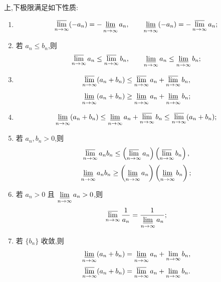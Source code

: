\begin{theorem}[\markstar]
  上,下极限满足如下性质:
  \begin{enumerate}
    \item
          \[
            \varlimsup\limits_{n\to\infty}(-a_n)=-\varliminf\limits_{n\to\infty}a_n,
            \qquad
            \varliminf\limits_{n\to\infty}(-a_n)=-\varlimsup\limits_{n\to\infty}a_n;
          \]
    \item 若 $a_n\leq b_n$,则
          \[
            \varlimsup\limits_{n\to\infty}a_n\leq\varlimsup\limits_{n\to\infty}b_n,
            \qquad
            \varliminf\limits_{n\to\infty}a_n\leq\varliminf\limits_{n\to\infty}b_n;
          \]
    \item
          \[
            \varlimsup\limits_{n\to\infty}(a_n+b_n)
            \leq
            \varlimsup\limits_{n\to\infty}a_n+
            \varlimsup\limits_{n\to\infty}b_n,
          \]
          \[
            \varliminf\limits_{n\to\infty}(a_n+b_n)
            \geq
            \varliminf\limits_{n\to\infty}a_n+
            \varliminf\limits_{n\to\infty}b_n;
          \]
    \item
          \[
            \varliminf\limits_{n\to\infty}(a_n+b_n)
            \leq
            \varliminf\limits_{n\to\infty}a_n+
            \varlimsup\limits_{n\to\infty}b_n
            \leq
            \varlimsup\limits_{n\to\infty}(a_n+b_n);
          \]
    \item 若 $a_n,b_n>0$,则
          \[
            \varlimsup\limits_{n\to\infty}a_nb_n
            \leq
            \left(\varlimsup\limits_{n\to\infty}a_n\right)
            \left(\varlimsup\limits_{n\to\infty}b_n\right),
          \]
          \[
            \varliminf\limits_{n\to\infty}a_nb_n
            \geq
            \left(\varliminf\limits_{n\to\infty}a_n\right)
            \left(\varliminf\limits_{n\to\infty}b_n\right);
          \]
    \item 若 $a_n>0$ 且 $\displaystyle \varliminf\limits_{n\to\infty}a_n>0$,则
          \[
            \varlimsup\limits_{n\to\infty}\dfrac{1}{a_n}
            =
            \dfrac{1}{\displaystyle \varliminf\limits_{n\to\infty}a_n};
          \]
    \item 若 $\{b_n\}$ 收敛,则
          \[
            \varliminf\limits_{n\to\infty}(a_n+b_n)
            =
            \varliminf\limits_{n\to\infty}a_n+\lim\limits_{n\to\infty}b_n,
          \]
          \[
            \varlimsup\limits_{n\to\infty}(a_n+b_n)
            =
            \varlimsup\limits_{n\to\infty}a_n+\lim\limits_{n\to\infty}b_n.
          \]
  \end{enumerate}
\end{theorem}

